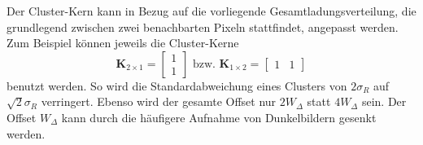 \noindent
Der Cluster-Kern kann in Bezug auf die vorliegende Gesamtladungsverteilung, die grundlegend zwischen zwei benachbarten Pixeln stattfindet, angepasst werden. Zum Beispiel können jeweils die Cluster-Kerne
\begin{equation}
    \mathbf{K}_{2\times1} = \begin{bmatrix}
1\\
1
\end{bmatrix}
\text{ bzw. }
    \mathbf{K}_{1\times2} = \begin{bmatrix}
1 & 1
\end{bmatrix}
\end{equation}
benutzt werden. So wird die Standardabweichung eines Clusters von $2\sigma_R$ auf $\sqrt{2}\sigma_R$ verringert. Ebenso wird der gesamte Offset nur $2W_\Delta$ statt $4W_\Delta$ sein. Der Offset $W_\Delta$ kann durch die häufigere Aufnahme von Dunkelbildern gesenkt werden.